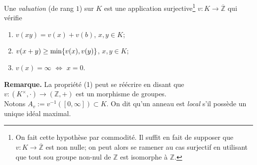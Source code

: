 \documentclass[a4paper, 12pt]{amsart}
\newcommand{\Z}{\mathbb{Z}}
\begin{document}
\subsubsection{}\label{ValDef}Une \textit{valuation} (de rang $1$) sur $K$ est une application surjective\footnote{On fait cette hypothèse par commodité. Il suffit en fait de supposer que $v:K\rightarrow \overline{\Z}$ est non nulle; on peut alors se ramener au cas surjectif en utilisant que  tout sou groupe non-nul de $\Z$ est isomorphe à $\Z$.}
 $v:K\rightarrow \overline{\Z}$  qui vérifie
\begin{enumerate}
\item $v(xy)=v (x)+v (b)$, $x,y\in K$;
\item $v(x+y)\geq \hbox{\rm min}\lbrace v(x),v(y)\rbrace$, $x,y\in K$;
\item $v(x)=\infty$ $\Leftrightarrow$ $x=0$.
\end{enumerate}

\noindent\textbf{Remarque.}   La propriété (1) peut se réécrire en disant que $v:(K^\times,\cdot)\rightarrow (\Z,+)$ est un morphisme de groupes.\\

\noindent Notons $A_v:=v^{-1}([0,\infty])\subset K$. On dit qu'un anneau   est \textit{local} s'il possède un unique idéal maximal.
 
\end{document}
